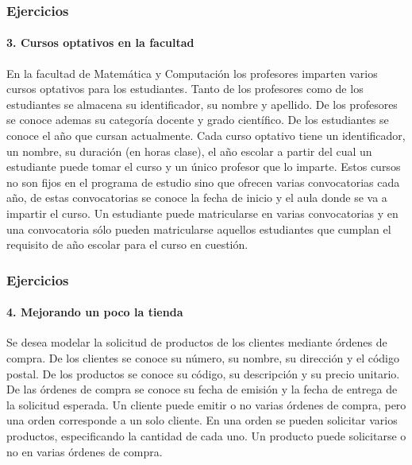 \begin{frame}
    \frametitle{Ejercicios}
    \framesubtitle{3. Cursos optativos en la facultad}

    En la facultad de Matem\'atica y Computaci\'on los profesores imparten varios cursos optativos para los estudiantes. Tanto de los profesores como de los estudiantes se almacena su identificador, su nombre y apellido. De los profesores se conoce ademas su categor\'ia docente y grado cient\'ifico. De los estudiantes se conoce el a\~no que cursan actualmente. Cada curso optativo tiene un identificador, un nombre, su duraci\'on (en horas clase), el a\~no escolar a partir del cual un estudiante puede tomar el curso y un \'unico profesor que lo imparte. Estos cursos no son fijos en el programa de estudio sino que ofrecen varias convocatorias cada a\~no, de estas convocatorias se conoce la fecha de inicio y el aula donde se va a impartir el curso. Un estudiante puede matricularse en varias convocatorias y en una convocatoria s\'olo pueden matricularse aquellos estudiantes que cumplan el requisito de a\~no escolar para el curso en cuesti\'on.

\end{frame}

\begin{frame}
    \frametitle{Ejercicios}
    \framesubtitle{4. Mejorando un poco la tienda}

    Se desea modelar la solicitud de productos de los clientes mediante \'ordenes de compra. De los clientes se conoce su n\'umero, su nombre, su direcci\'on y el c\'odigo postal. De los productos se conoce su c\'odigo, su descripci\'on y su precio unitario. De las \'ordenes de compra se conoce su fecha de emisi\'on y la fecha de entrega de la solicitud esperada. Un cliente puede emitir o no varias \'ordenes de compra, pero una orden corresponde a un solo cliente. En una orden se pueden solicitar varios productos, especificando la cantidad de cada uno. Un producto puede solicitarse o no en varias \'ordenes de compra.

\end{frame}